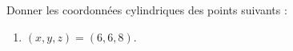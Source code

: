 
\begin{exercice}\label{exoOutilsMath-0005}

	Donner les coordonnées cylindriques des points suivants :
	\begin{enumerate}
		\item
			 $(x,y,z)=(6,6,8)$.
	\end{enumerate}

\end{exercice}
